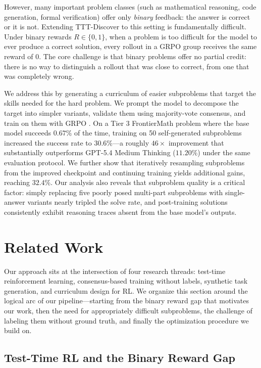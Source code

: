 \documentclass{article}
\begin{document}
However, many important problem classes (such as mathematical reasoning, code generation, formal verification) offer only \textit{binary} feedback: the answer is correct or it is not. Extending TTT-Discover to this setting is fundamentally difficult. Under binary rewards $R \in \{0, 1\}$, when a problem is too difficult for the model to ever produce a correct solution, every rollout in a GRPO group receives the same reward of $0$. The core challenge is that binary problems offer no partial credit: there is no way to distinguish a rollout that was close to correct, from one that was completely wrong.
 
We address this by generating a curriculum of easier subproblems that target the skills needed for the hard problem. We prompt the model to decompose the target into simpler variants, validate them using majority-vote consensus, and train on them with GRPO \cite{deepseekmath}. On a Tier 3 FrontierMath problem where the base model succeeds $0.67\%$ of the time, training on 50 self-generated subproblems increased the success rate to $30.6\%$---a roughly $46\times$ improvement that substantially outperforms GPT-5.4 Medium Thinking ($11.20\%$) under the same evaluation protocol. We further show that iteratively resampling subproblems from the improved checkpoint and continuing training yields additional gains, reaching $32.4\%$. Our analysis also reveals that subproblem quality is a critical factor: simply replacing five poorly posed multi-part subproblems with single-answer variants nearly tripled the solve rate, and post-training solutions consistently exhibit reasoning traces absent from the base model's outputs.

\section{Related Work}

Our approach sits at the intersection of four research threads: test-time reinforcement learning, consensus-based training without labels, synthetic task generation, and curriculum design for RL. We organize this section around the logical arc of our pipeline—starting from the binary reward gap that motivates our work, then the need for appropriately difficult subproblems, the challenge of labeling them without ground truth, and finally the optimization procedure we build on.

\subsection{Test-Time RL and the Binary Reward Gap}
\label{sec:ttt_rl}
\end{document}

